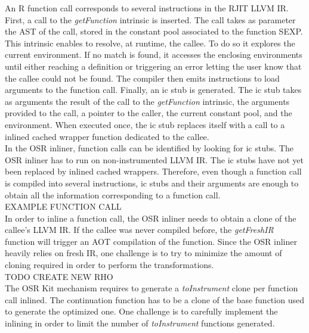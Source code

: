 An R function call corresponds to several instructions in the RJIT LLVM IR.
First, a call to the \textit{getFunction} intrinsic is inserted.
The call takes as parameter the AST of the call, stored in the constant pool associated to the function SEXP.
This intrinsic enables to resolve, at runtime, the callee. 
To do so it explores the current environment.
If no match is found, it accesses the enclosing environments until either reaching a definition or triggering an error letting the user know that the callee could not be found.
The compiler then emits instructions to load arguments to the function call.
Finally, an ic stub is generated. 
The ic stub takes as arguments the result of the call to the \textit{getFunction} intrinsic, the arguments provided to the call, a pointer to the caller, the current constant pool, and the environment.
When executed once, the ic stub replaces itself with a call to a inlined cached wrapper function dedicated to the callee.\\

In the OSR inliner, function calls can be identified by looking for ic stubs.
The OSR inliner has to run on non-instrumented LLVM IR. 
The ic stubs have not yet been replaced by inlined cached wrappers.
Therefore, even though a function call is compiled into several instructions, ic stubs and their arguments are enough to obtain all the information corresponding to a function call.\\

EXAMPLE FUNCTION CALL\\

In order to inline a function call, the OSR inliner needs to obtain a clone of the callee's LLVM IR.
If the callee was never compiled before, the \textit{getFreshIR} function will trigger an AOT compilation of the function.
Since the OSR inliner heavily relies on fresh IR, one challenge is to try to minimize the amount of cloning required in order to perform the transformations.\\

TODO CREATE NEW RHO\\

The OSR Kit mechanism requires to generate a \textit{toInstrument} clone per function call inlined.
The continuation function has to be a clone of the base function used to generate the optimized one.
One challenge is to carefully implement the inlining in order to limit the number of \textit{toInstrument} functions generated.\\

